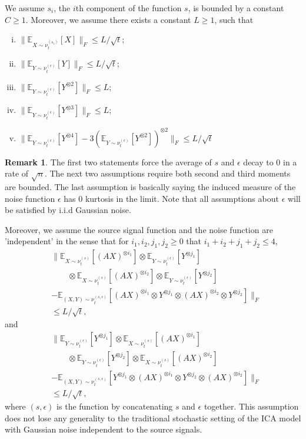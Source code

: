 \documentclass[twoside]{article}
\newcommand{\E}{\mathbb{E}}
\theoremstyle{definition}
\newtheorem{remark}[lemma]{Remark}
\begin{document}
We assume $s_i$, the $i$th component of the function $s$, is bounded by a constant $C\ge 1$.
Moreover, we assume there exists a constant $L\ge 1$, such that 
\begin{enumerate}[i.]
\vspace{-3mm}
\item $\| \E_{X\sim \nu_t^{(s_i)}} [X] \|_F\le L/\sqrt{t}$;
\item $\| \E_{Y\sim \nu_t^{(\epsilon)}} [Y] \|_F \le L/\sqrt{t}$;
\item $\| \E_{Y\sim \nu_t^{(\epsilon)}} [Y^{\otimes 2}] \|_F \le L$;
\item $\| \E_{Y\sim \nu_t^{(\epsilon)}} [Y^{\otimes 3}] \|_F \le L$;
\item $\| \E_{Y\sim \nu_t^{(\epsilon)}} [Y^{\otimes4}] - 3(\E_{Y\sim \nu_t^{(\epsilon)}} [Y^{\otimes2}])^{\otimes 2} \|_F\le L/\sqrt{t}$
\end{enumerate}
\vspace{-2mm}
\begin{remark}
The first two statements force the average of $s$ and $\epsilon$ decay to 0 in a rate of $\sqrt{n}$.
The next two assumptions require both second and third moments are bounded.
The last assumption is basically saying the induced measure of the noise function $\epsilon$ has 0 kurtosis in the limit.
Note that all assumptions about $\epsilon$ will be satisfied by i.i.d Gaussian noise.
\end{remark}
Moreover, we assume the source signal function and the noise function are 'independent' in the sense that for $i_1,i_2,j_1,j_2 \ge 0$ that $i_1+i_2+j_1+j_2 \le 4$,  
\begin{align*}
& \| \E_{X\sim \nu_t^{(s)}} [(AX)^{\otimes i_1}]\otimes \E_{Y\sim \nu_t^{(\epsilon)}} [Y^{\otimes j_1}] \\
& \quad \quad \otimes \E_{X\sim \nu_t^{(s)}} [(AX)^{\otimes i_2}]\otimes \E_{Y\sim \nu_t^{(\epsilon)}} [Y^{\otimes j_2}]\\
& - \E_{(X, Y)\sim \nu_t^{(s, \epsilon)}} [(AX)^{\otimes i_1}\otimes Y^{\otimes j_1}\otimes (AX)^{\otimes i_2}\otimes Y^{\otimes j_2}]  \|_F \\
& \le L/\sqrt{t},
\end{align*}
and 
\begin{align*}
& \| \E_{Y\sim \nu_t^{(\epsilon)}} [Y^{\otimes j_1}] \otimes \E_{X\sim \nu_t^{(s)}} [(AX)^{\otimes i_1}] \\
& \quad \quad \otimes \E_{Y\sim \nu_t^{(\epsilon)}} [Y^{\otimes j_2}] \otimes \E_{X\sim \nu_t^{(s)}} [(AX)^{\otimes i_2}]\\
& - \E_{(X, Y)\sim \nu_t^{(s, \epsilon)}} [ Y^{\otimes j_1}\otimes (AX)^{\otimes i_1}\otimes Y^{\otimes j_2}\otimes (AX)^{\otimes i_2}]  \|_F \\
& \le L/\sqrt{t},
\end{align*}
 where $(s,\epsilon)$ is the function by concatenating $s$ and $\epsilon$ together.  
This assumption does not lose any generality to the traditional stochastic setting of the ICA model with Gaussian noise independent to the source signals. 
\end{document}
